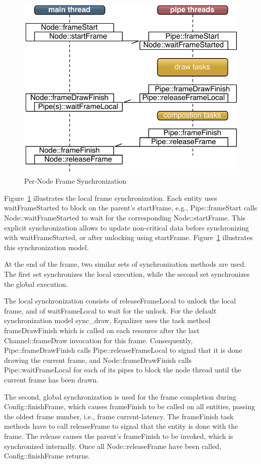 \documentclass[10pt,a4]{scrartcl}
\newcommand{\fig}[1]{Figure~\ref{#1}}
\begin{document}
\begin{figure}
  \includegraphics[width=.618\textwidth]{images/frameSync.pdf}
  {\caption{\label{fFrameSync}Per-Node Frame Synchronization}}
\end{figure}
\fig{fFrameSync} illustrates the local frame synchronization.
Each entity uses \textsf{waitFrame\-Started} to block on the parent's
\textsf{startFrame}, e.g., \textsf{Pipe::\-frame\-Start} calls
\textsf{Node::wait\-Frame\-Started} to wait for the corresponding
\textsf{Node::start\-Fra\-me}. This explicit synchronization allows to
update non-critical data before synchronizing with
\textsf{waitFrameStarted}, or after unlocking using
\textsf{start\-Fra\-me}. \fig{fFrameSync} illustrates this
synchronization model.

At the end of the frame, two similar sets of synchronization methods are
used. The first set synchronizes the local execution, while the second
set synchronizes the global execution.

The local synchronization consists of \textsf{releaseFrameLocal} to
unlock the local frame, and of \textsf{waitFrameLocal} to wait for the
unlock. For the default synchronization model \textsf{sync\_draw},
Equalizer uses the task method \textsf{frameDrawFinish} which is called
on each resource after the last \textsf{Channel::frameDraw} invocation
for this frame. Consequently, \textsf{Pipe::frameDraw\-Fi\-nish} calls
\textsf{Pipe::\-release\-Frame\-Lo\-cal} to signal that it is done
drawing the current frame, and \textsf{Node::frameDrawFinish} calls
\textsf{Pipe::waitFrameLocal} for each of its pipes to block the node
thread until the current frame has been drawn.

The second, global synchronization is used for the frame completion
during \textsf{Config::finishFrame}, which causes \textsf{frameFinish}
to be called on all entities, passing the oldest frame number, i.e., frame
\textsf{current-latency}. The \textsf{frameFinish} task methods have to
call \textsf{releaseFrame} to signal that the entity is done with the
frame. The release causes the parent's \textsf{frameFinish} to be
invoked, which is synchronized internally. Once all
\textsf{Node::releaseFrame} have been called,
\textsf{Config::finishFrame} returns.
\end{document}
